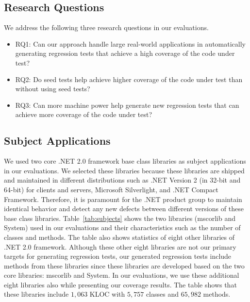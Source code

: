 \subsection{Research Questions}
\label{sec:research}

We address the following three research questions in our evaluations.

\begin{itemize}
\item RQ1: Can our approach handle large real-world applications in automatically generating regression tests that achieve a high coverage of the code under test? 
\item RQ2: Do seed tests help achieve higher coverage of the code under test than without using seed tests?
\item RQ3: Can more machine power help generate new regression tests that can achieve more coverage of the code under test?
\end{itemize}

\subsection{Subject Applications}

We used two core .NET 2.0 framework base class libraries as subject applications in our evaluations. We selected these libraries because these libraries are shipped and maintained in different distributions such as .NET Version 2 (in 32-bit and 64-bit) for clients and servers, Microsoft Silverlight, and .NET Compact Framework. Therefore, it is paramount for the .NET product group to maintain identical behavior and detect any new defects between different versions of these base class libraries. Table~\ref{tab:subjects} shows the two libraries (mscorlib and System) used in our evaluations and their characteristics such as the number of classes and methods. The table also shows statistics of eight other libraries of .NET 2.0 framework. Although these other eight libraries are not our primary targets for generating regression tests, our generated regression tests include methods from these libraries since these libraries are developed based on the two core libraries: mscorlib and System. In our evaluations, we use these additional eight libraries also while presenting our coverage results. The table shows that these libraries include $1,063$ KLOC with $5,757$ classes and $65,982$ methods.

